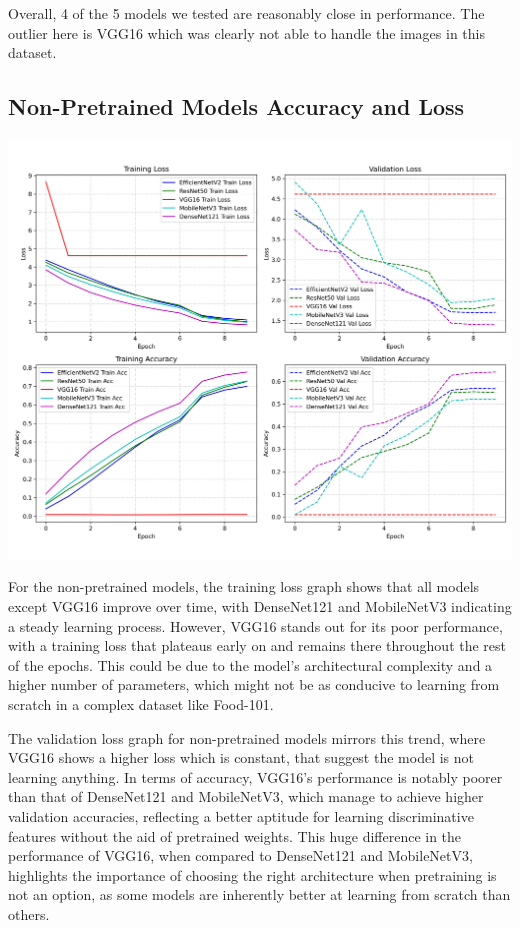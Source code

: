 \documentclass{article}
\begin{document}
Overall, 4 of the 5 models we tested are reasonably close in performance. The outlier here is VGG16 which was clearly not able to handle the images in this dataset.



\subsection*{Non-Pretrained Models Accuracy and Loss}

\begin{center}
    \includegraphics[width=1\linewidth]{images/npt_models.jpg}
\end{center}

For the non-pretrained models, the training loss graph shows that all models except VGG16 improve over time, with DenseNet121 and MobileNetV3 indicating a steady learning process. However, VGG16 stands out for its poor performance, with a training loss that plateaus early on and remains there throughout the rest of the epochs. This could be due to the model's architectural complexity and a higher number of parameters, which might not be as conducive to learning from scratch in a complex dataset like Food-101.

The validation loss graph for non-pretrained models mirrors this trend, where VGG16 shows a higher loss which is constant, that suggest the model is not learning anything. In terms of accuracy, VGG16's performance is notably poorer than that of DenseNet121 and MobileNetV3, which manage to achieve higher validation accuracies, reflecting a better aptitude for learning discriminative features without the aid of pretrained weights. This huge difference in the performance of VGG16, when compared to DenseNet121 and MobileNetV3, highlights the importance of choosing the right architecture when pretraining is not an option, as some models are inherently better at learning from scratch than others.
\end{document}

